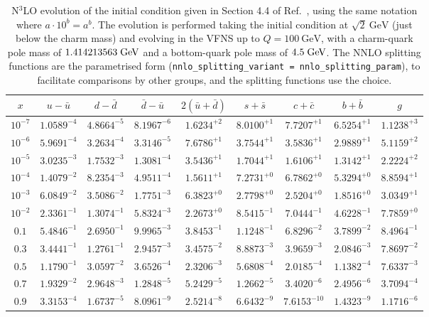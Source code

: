 \begin{table}[p]
  \small \centering
  \begin{tabular}{c|cccccccc}
    $x$ &  $u-\bar u$ &$d-\bar d$ &$\bar d-\bar u$ &  $ 2(\bar u+\bar d)$  &$s+\bar s$&$c+\bar c$ &$b+\bar b$  &   $g$\\
    \toprule
$10^{-7}$ &  $1.0589^{-4}$ &  $4.8664^{-5}$ &  $8.1967^{-6}$ &  $1.6234^{+2}$ &  $8.0100^{+1}$ &  $7.7207^{+1}$ &  $6.5254^{+1}$ &  $1.1238^{+3}$ \\
$10^{-6}$ &  $5.9691^{-4}$ &  $3.2634^{-4}$ &  $3.3146^{-5}$ &  $7.6786^{+1}$ &  $3.7544^{+1}$ &  $3.5836^{+1}$ &  $2.9889^{+1}$ &  $5.1159^{+2}$ \\
$10^{-5}$ &  $3.0235^{-3}$ &  $1.7532^{-3}$ &  $1.3081^{-4}$ &  $3.5436^{+1}$ &  $1.7044^{+1}$ &  $1.6106^{+1}$ &  $1.3142^{+1}$ &  $2.2224^{+2}$ \\
$10^{-4}$ &  $1.4079^{-2}$ &  $8.2354^{-3}$ &  $4.9511^{-4}$ &  $1.5611^{+1}$ &  $7.2731^{+0}$ &  $6.7862^{+0}$ &  $5.3294^{+0}$ &  $8.8594^{+1}$ \\
$10^{-3}$ &  $6.0849^{-2}$ &  $3.5086^{-2}$ &  $1.7751^{-3}$ &  $6.3823^{+0}$ &  $2.7798^{+0}$ &  $2.5204^{+0}$ &  $1.8516^{+0}$ &  $3.0349^{+1}$ \\
$10^{-2}$ &  $2.3361^{-1}$ &  $1.3074^{-1}$ &  $5.8324^{-3}$ &  $2.2673^{+0}$ &  $8.5415^{-1}$ &  $7.0444^{-1}$ &  $4.6228^{-1}$ &  $7.7859^{+0}$ \\
$0.1$    &  $5.4846^{-1}$ &  $2.6950^{-1}$ &  $9.9965^{-3}$ &  $3.8453^{-1}$ &  $1.1248^{-1}$ &  $6.8296^{-2}$ &  $3.7899^{-2}$ &  $8.4964^{-1}$ \\
$0.3$    &  $3.4441^{-1}$ &  $1.2761^{-1}$ &  $2.9457^{-3}$ &  $3.4575^{-2}$ &  $8.8873^{-3}$ &  $3.9659^{-3}$ &  $2.0846^{-3}$ &  $7.8697^{-2}$ \\
$0.5$    &  $1.1790^{-1}$ &  $3.0597^{-2}$ &  $3.6526^{-4}$ &  $2.3206^{-3}$ &  $5.6808^{-4}$ &  $2.0185^{-4}$ &  $1.1382^{-4}$ &  $7.6337^{-3}$ \\
$0.7$    &  $1.9329^{-2}$ &  $2.9648^{-3}$ &  $1.2848^{-5}$ &  $5.2429^{-5}$ &  $1.2662^{-5}$ &  $3.4020^{-6}$ &  $2.4956^{-6}$ &  $3.7094^{-4}$ \\
$0.9$    &  $3.3153^{-4}$ &  $1.6737^{-5}$ &  $8.0961^{-9}$ &  $2.5214^{-8}$ &  $6.6432^{-9}$ &  $7.6153^{-10}$ &  $1.4323^{-9}$ &  $1.1716^{-6}$ 
  \end{tabular}
  \caption{N$^3$LO evolution of the initial condition given in Section
    4.4 of Ref.~\cite{Dittmar:2005ed}, using the same notation where
    $a\cdot10^{b} = a^b$. The evolution is performed taking the
    initial condition at $\sqrt{2}~\text{GeV}$ (just below the charm
    mass) and evolving in the VFNS up to $Q=100~\text{GeV}$, with a
    charm-quark pole mass of $1.414213563\;\mathrm{GeV}$ and a bottom-quark
    pole mass of $4.5\;\mathrm{GeV}$.
    The NNLO splitting functions are the parametrised form
    (\texttt{nnlo\_splitting\_variant = nnlo\_splitting\_param}), to 
    facilitate comparisons by other groups, and the \ntlo splitting
    functions use the
     choice.}
  \label{tab:n3lo-evolve}
\end{table}

